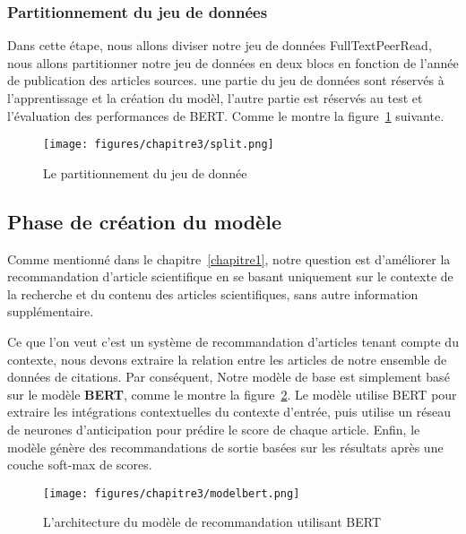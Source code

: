         \subsubsection{Partitionnement du jeu de données}
        \par Dans cette étape, nous allons diviser notre jeu de données FullTextPeerRead, nous allons partitionner notre jeu de données en deux blocs en fonction de l'année de publication des articles sources. une partie du jeu de données sont réservés à l’apprentissage et la création du modèl, l'autre partie est réservés au test  et l’évaluation des performances de BERT. Comme le montre la figure~\ref{fig:fig3ch3} suivante.
        
            \begin{figure}[H]
            	\begin{center}
            		\texttt{[image: figures/chapitre3/split.png]}
            	\end{center}
            	\caption {Le partitionnement du jeu de donnée}
            	\label{fig:fig3ch3}
            \end{figure} 
    
    \subsection{Phase de création du modèle }
    \par Comme mentionné dans le chapitre~\ref{chapitre1}, notre question est d'améliorer la recommandation d'article scientifique en se basant uniquement sur le contexte de la recherche et du contenu des articles scientifiques, sans autre information supplémentaire.
    \par Ce que l'on veut c'est un système de recommandation d'articles tenant compte du contexte, nous devons extraire la relation entre les articles de notre ensemble de données de citations. Par conséquent, Notre modèle de base est simplement basé sur le modèle \textbf{BERT}, comme le montre la figure~\ref{fig:modelbert}. Le modèle utilise BERT pour extraire les intégrations contextuelles du contexte d'entrée, puis utilise un réseau de neurones d'anticipation pour prédire le score de chaque article. Enfin, le modèle génère des recommandations de sortie basées sur les résultats après une couche soft-max de scores. 
        
    
        \begin{figure}[H]
            \begin{center}
            	\texttt{[image: figures/chapitre3/modelbert.png]}
            \end{center}
            \caption {L'architecture du modèle de recommandation utilisant BERT }
            \label{fig:modelbert}
        \end{figure} 
    

